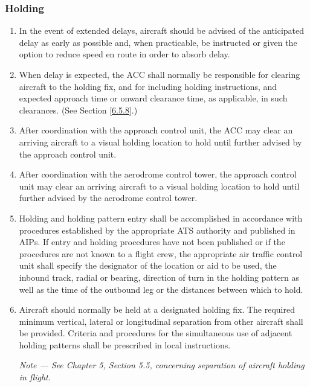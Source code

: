 \documentclass[../main.tex]{subfiles}
\begin{document}
    \subsubsection{Holding}

    \begin{enumerate}
        \item In the event of extended delays, aircraft should be advised of the anticipated delay as early as possible and, when practicable, be instructed or given the option to reduce speed en route in order to absorb delay.
        \item When delay is expected, the ACC shall normally be responsible for clearing aircraft to the holding fix, and for including holding instructions, and expected approach time or onward clearance time, as applicable, in such clearances. (See Section \ref{6.5.8}.)
        \item After coordination with the approach control unit, the ACC may clear an arriving aircraft to a visual holding location to hold until further advised by the approach control unit.
        \item After coordination with the aerodrome control tower, the approach control unit may clear an arriving aircraft to a visual holding location to hold until further advised by the aerodrome control tower.
        \item Holding and holding pattern entry shall be accomplished in accordance with procedures established by the appropriate ATS authority and published in AIPs. If entry and holding procedures have not been published or if the procedures are not known to a flight crew, the appropriate air traffic control unit shall specify the designator of the location or aid to be used, the inbound track, radial or bearing, direction of turn in the holding pattern as well as the time of the outbound leg or the distances between which to hold.
        \item Aircraft should normally be held at a designated holding fix. The required minimum vertical, lateral or longitudinal separation from other aircraft shall be provided. Criteria and procedures for the simultaneous use of adjacent holding patterns shall be prescribed in local instructions.

        \textit{Note --- See Chapter 5, Section 5.5, concerning separation of aircraft holding in flight.}


\end{enumerate}
\end{document}
